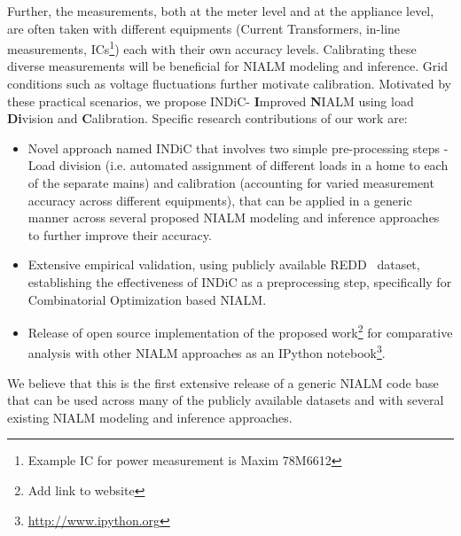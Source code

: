 \documentclass[conference]{IEEEtran}
\newcommand{\indic}{INDiC}
\begin{document}
\noindent Further, the measurements, both at the meter level and at the appliance level, are often taken with different equipments (Current Transformers, in-line measurements, ICs\footnote{Example IC for power measurement is Maxim 78M6612}) each with their own accuracy levels. Calibrating these diverse measurements will be beneficial for NIALM modeling and inference. Grid conditions such as voltage fluctuations further motivate calibration. Motivated by these practical scenarios, we propose \indic - \textbf{I}mproved \textbf{N}IALM using load \textbf{Di}vision and \textbf{C}alibration. Specific research contributions of our work are:
\begin{itemize}
\item Novel approach named INDiC that involves two simple pre-processing steps - Load division (i.e. automated assignment of different loads in a home to each of the separate mains) and calibration (accounting for varied measurement accuracy across different equipments), that can be applied in a generic manner across several proposed NIALM modeling and inference approaches to further improve their accuracy. 
\item Extensive empirical validation, using publicly available REDD~\cite{redd} dataset, establishing the effectiveness of INDiC as a preprocessing step, specifically for Combinatorial Optimization based NIALM. 
\item Release of open source implementation of the proposed work\footnote{Add link to website} for comparative analysis with other NIALM approaches as an IPython notebook\footnote{\url{http://www.ipython.org}}. 
\end{itemize}
\noindent We believe that this is the first extensive release of a generic NIALM code base that can be used across many of the publicly available datasets and with several existing NIALM modeling and inference approaches.
\end{document}
